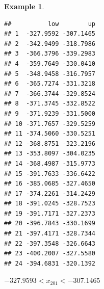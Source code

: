 \documentclass[
]{book}
\newenvironment{Shaded}{\begin{snugshade}}{\end{snugshade}}
\newcommand{\CommentTok}[1]{\textcolor[rgb]{0.56,0.35,0.01}{\textit{#1}}}
\newcommand{\DecValTok}[1]{\textcolor[rgb]{0.00,0.00,0.81}{#1}}
\newcommand{\NormalTok}[1]{#1}
\newcommand{\OtherTok}[1]{\textcolor[rgb]{0.56,0.35,0.01}{#1}}
\newcommand{\SpecialCharTok}[1]{\textcolor[rgb]{0.00,0.00,0.00}{#1}}
\theoremstyle{definition}
\theoremstyle{definition}
\newtheorem{example}{Example}[chapter]
\theoremstyle{definition}
\theoremstyle{definition}
\theoremstyle{remark}
\begin{document}
\begin{example}
\begin{verbatim}
##          low        up
## 1  -327.9592 -307.1465
## 2  -342.9499 -318.7986
## 3  -366.3796 -339.2983
## 4  -359.7649 -330.0410
## 5  -348.9458 -316.7957
## 6  -365.7274 -331.3218
## 7  -366.3744 -329.8524
## 8  -371.3745 -332.8522
## 9  -371.9239 -331.5000
## 10 -371.7657 -329.5259
## 11 -374.5060 -330.5251
## 12 -368.8751 -323.2196
## 13 -353.8097 -304.0235
## 14 -368.4987 -315.9773
## 15 -391.7633 -336.6422
## 16 -385.0685 -327.4650
## 17 -374.2261 -314.2429
## 18 -391.0245 -328.7523
## 19 -391.7171 -327.2373
## 20 -396.7843 -330.1699
## 21 -397.4171 -328.7344
## 22 -397.3548 -326.6643
## 23 -400.2007 -327.5580
## 24 -394.6831 -320.1392
\end{verbatim}

\(-327.9593<x_{201}<-307.1465\)

\begin{Shaded}
\end{Shaded}


\end{example}
\end{document}
